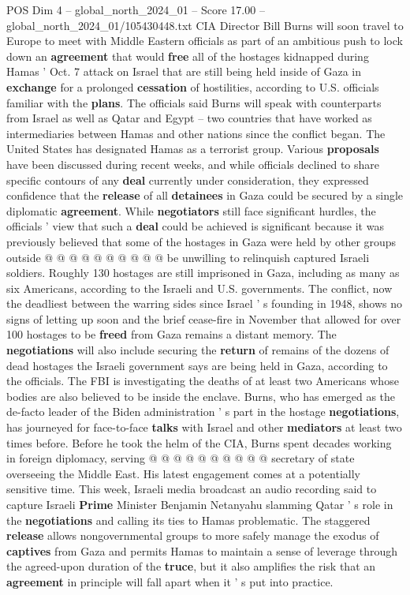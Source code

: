 \begin{textsample}{POS Dim 4 – global\_north\_2024\_01 – Score 17.00 – global\_north\_2024\_01/105430448.txt}  \label{ex:f4_pos_347}
CIA Director Bill Burns will soon travel to Europe to meet with Middle Eastern officials as part of an ambitious push to lock down an \textbf{agreement} that would \textbf{free} all of the hostages kidnapped during Hamas ' Oct. 7 attack on Israel that are still being held inside of Gaza in \textbf{exchange} for a prolonged \textbf{cessation} of hostilities, according to U.S. officials familiar with the \textbf{plans}.
The officials said Burns will speak with counterparts from Israel as well as Qatar and Egypt -- two countries that have worked as intermediaries between Hamas and other nations since the conflict began.
The United States has designated Hamas as a terrorist group.
Various \textbf{proposals} have been discussed during recent weeks, and while officials declined to share specific contours of any \textbf{deal} currently under consideration, they expressed confidence that the \textbf{release} of all \textbf{detainees} in Gaza could be secured by a single diplomatic \textbf{agreement}.
While \textbf{negotiators} still face significant hurdles, the officials ' view that such a \textbf{deal} could be achieved is significant because it was previously believed that some of the hostages in Gaza were held by other groups outside @ @ @ @ @ @ @ @ @ @ be unwilling to relinquish captured Israeli soldiers.
Roughly 130 hostages are still imprisoned in Gaza, including as many as six Americans, according to the Israeli and U.S. governments.
The conflict, now the deadliest between the warring sides since Israel ' s founding in 1948, shows no signs of letting up soon and the brief cease-fire in November that allowed for over 100 hostages to be \textbf{freed} from Gaza remains a distant memory.
The \textbf{negotiations} will also include securing the \textbf{return} of remains of the dozens of dead hostages the Israeli government says are being held in Gaza, according to the officials.
The FBI is investigating the deaths of at least two Americans whose bodies are also believed to be inside the enclave.
Burns, who has emerged as the de-facto leader of the Biden administration ' s part in the hostage \textbf{negotiations}, has journeyed for face-to-face \textbf{talks} with Israel and other \textbf{mediators} at least two times before.
Before he took the helm of the CIA, Burns spent decades working in foreign diplomacy, serving @ @ @ @ @ @ @ @ @ @ secretary of state overseeing the Middle East.
His latest engagement comes at a potentially sensitive time.
This week, Israeli media broadcast an audio recording said to capture Israeli \textbf{Prime} Minister Benjamin Netanyahu slamming Qatar ' s role in the \textbf{negotiations} and calling its ties to Hamas problematic.
The staggered \textbf{release} allows nongovernmental groups to more safely manage the exodus of \textbf{captives} from Gaza and permits Hamas to maintain a sense of leverage through the agreed-upon duration of the \textbf{truce}, but it also amplifies the risk that an \textbf{agreement} in principle will fall apart when it ' s put into practice.

\end{textsample}

